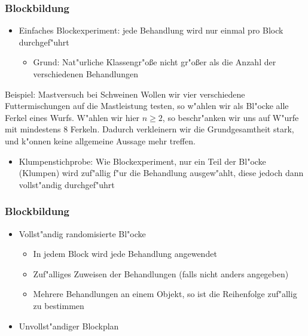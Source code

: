 \documentclass{beamer}
\begin{document}
\begin{frame}
  \frametitle{Blockbildung}
  \begin{itemize}[<+->]
    \item Einfaches Blockexperiment: jede Behandlung wird nur einmal pro Block durchgef"uhrt
      \begin{itemize}[<+->]
        \item Grund: Nat"urliche Klassengr"o{\ss}e nicht gr"o{\ss}er als die Anzahl der verschiedenen Behandlungen
      \end{itemize}
  \end{itemize}
  \pause
  \begin{exampleblock}{Beispiel: Mastversuch bei Schweinen}
    Wollen wir vier verschiedene Futtermischungen auf die Mastleistung testen, so w"ahlen wir als Bl"ocke alle Ferkel eines Wurfs. W"ahlen wir hier $n\geq 2$, so beschr"anken wir uns auf W"urfe mit mindestens $8$ Ferkeln. Dadurch verkleinern wir die Grundgesamtheit stark, und k"onnen keine allgemeine Aussage mehr treffen.
  \end{exampleblock}
  \pause
  \begin{itemize}[<+->]
    \item Klumpenstichprobe: Wie Blockexperiment, nur ein Teil der Bl"ocke (Klumpen) wird zuf"allig f"ur die Behandlung ausgew"ahlt, diese jedoch dann vollst"andig durchgef"uhrt
  \end{itemize}
\end{frame}

\begin{frame}
  \frametitle{Blockbildung}
  \begin{itemize}[<+->]
    \item Vollst"andig randomisierte Bl"ocke
      \begin{itemize}[<+->]
        \item In jedem Block wird jede Behandlung angewendet
        \item Zuf"alliges Zuweisen der Behandlungen (falls nicht anders angegeben)
        \item Mehrere Behandlungen an einem Objekt, so ist die Reihenfolge zuf"allig zu bestimmen
      \end{itemize}
    \item Unvollst"andiger Blockplan
  \end{itemize}
\end{frame}
\end{document}
